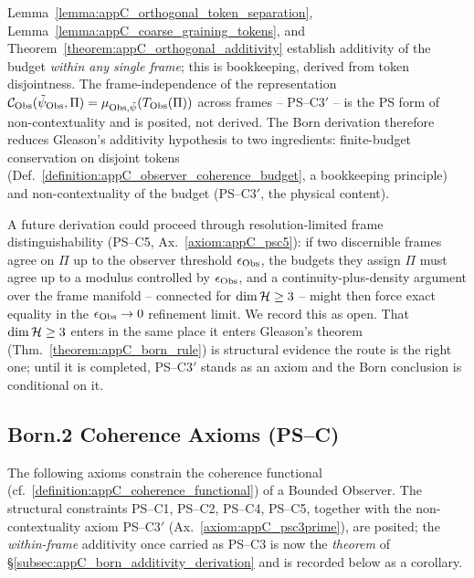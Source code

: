 \begin{remark}
\label{remark:appC_born_honest_reduction}
Lemma~\ref{lemma:appC_orthogonal_token_separation},
Lemma~\ref{lemma:appC_coarse_graining_tokens}, and
Theorem~\ref{theorem:appC_orthogonal_additivity} establish additivity of the budget
\emph{within any single frame}; this is bookkeeping, derived from token disjointness.
The frame-independence of the representation
$\mathcal{C}_{\mathrm{Obs}}(\tilde\psi_{\mathrm{Obs}},\Pi) = \mu_{\mathrm{Obs},\tilde\psi}(T_{\mathrm{Obs}}(\Pi))$ across
frames -- PS--C3$'$ -- is the PS form of non-contextuality and is posited, not derived.
The Born derivation therefore reduces Gleason's additivity hypothesis to two
ingredients: finite-budget conservation on disjoint tokens
(Def.~\ref{definition:appC_observer_coherence_budget}, a bookkeeping principle) and
non-contextuality of the budget (PS--C3$'$, the physical content).
\end{remark}

\begin{remark}
\label{remark:appC_psc3prime_open_route}
A future derivation could proceed through resolution-limited frame distinguishability
(PS--C5, Ax.~\ref{axiom:appC_psc5}): if two discernible frames agree on $\Pi$ up to the
observer threshold $\epsilon_{\mathrm{Obs}}$, the budgets they assign $\Pi$ must agree up to a
modulus controlled by $\epsilon_{\mathrm{Obs}}$, and a continuity-plus-density argument over the
frame manifold -- connected for $\dim\mathcal{H} \ge 3$ -- might then force exact equality
in the $\epsilon_{\mathrm{Obs}} \to 0$ refinement limit. We record this as open. That
$\dim\mathcal{H} \ge 3$ enters in the same place it enters Gleason's theorem
(Thm.~\ref{theorem:appC_born_rule}) is structural evidence the route is the right one;
until it is completed, PS--C3$'$ stands as an axiom and the Born conclusion is
conditional on it.
\end{remark}

\subsection{Born.2 Coherence Axioms (PS–C)}
\label{subsec:appC_born_axioms}
The following axioms constrain the coherence functional (cf.~\ref{definition:appC_coherence_functional}) of a Bounded Observer. The structural constraints
PS--C1, PS--C2, PS--C4, PS--C5, together with the non-contextuality axiom PS--C3$'$
(Ax.~\ref{axiom:appC_psc3prime}), are posited; the \emph{within-frame} additivity once
carried as PS--C3 is now the \emph{theorem} of
\S\ref{subsec:appC_born_additivity_derivation} and is recorded below as a corollary.

